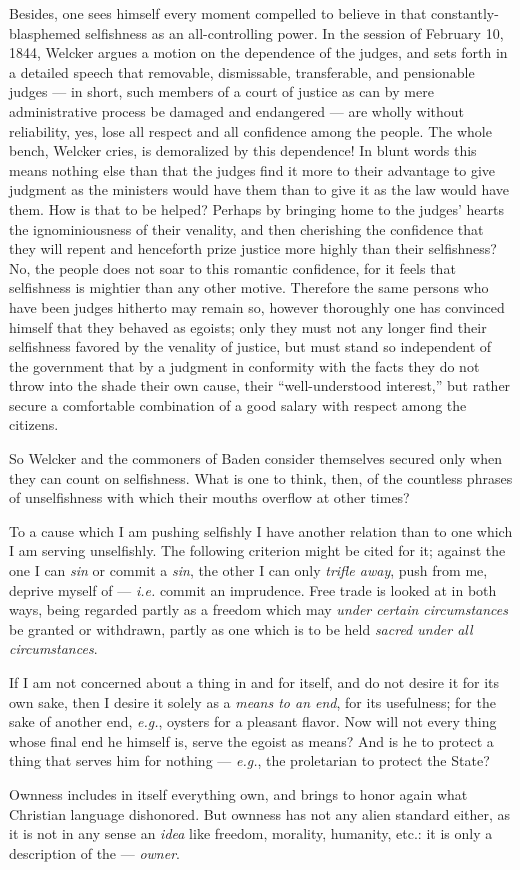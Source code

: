 Besides, one sees himself every moment compelled to believe in that 
constantly-blasphemed selfishness as an all-controlling power. In the session 
of February 10, 1844, Welcker argues a motion on the dependence of the judges, 
and sets forth in a detailed speech that removable, dismissable, transferable, 
and pensionable judges --- in short, such members of a court of justice as can 
by mere administrative process be damaged and endangered --- are wholly without 
reliability, yes, lose all respect and all confidence among the people. The 
whole bench, Welcker cries, is demoralized by this dependence! In blunt words 
this means nothing else than that the judges find it more to their advantage 
to give judgment as the ministers would have them than to give it as the law 
would have them. How is that to be helped? Perhaps by bringing home to the 
judges' hearts the ignominiousness of their venality, and then cherishing the 
confidence that they will repent and henceforth prize justice more highly than 
their selfishness? No, the people does not soar to this romantic confidence, 
for it feels that selfishness is mightier than any other motive. Therefore the 
same persons who have been judges hitherto may remain so, however thoroughly 
one has convinced himself that they behaved as egoists; only they must not any 
longer find their selfishness favored by the venality of justice, but must 
stand so independent of the government that by a judgment in conformity with 
the facts they do not throw into the shade their own cause, their 
``well-understood interest,'' but rather secure a comfortable combination of 
a good salary with respect among the citizens.

So Welcker and the commoners of Baden consider themselves secured only when 
they can count on selfishness. What is one to think, then, of the countless 
phrases of unselfishness with which their mouths overflow at other times?

To a cause which I am pushing selfishly I have another relation than to one 
which I am serving unselfishly. The following criterion might be cited for it; 
against the one I can \textit{sin} or commit a \textit{sin}, the other I can 
only \textit{trifle away}, push from me, deprive myself of --- \textit{i.e.} 
commit an imprudence. Free trade is looked at in both ways, being regarded 
partly as a freedom which may \textit{under certain circumstances} be granted 
or withdrawn, partly as one which is to be held \textit{sacred under all 
circumstances}.

If I am not concerned about a thing in and for itself, and do not desire it 
for its own sake, then I desire it solely as a \textit{means to an end}, for 
its usefulness; for the sake of another end, \textit{e.g.}, oysters for a 
pleasant flavor. Now will not every thing whose final end he himself is, serve 
the egoist as means? And is he to protect a thing that serves him for nothing --- \textit{e.g.}, the proletarian to protect the State?

Ownness includes in itself everything own, and brings to honor again what 
Christian language dishonored. But ownness has not any alien standard either, 
as it is not in any sense an \textit{idea} like freedom, morality, humanity, 
etc.: it is only a description of the --- \textit{owner}.
